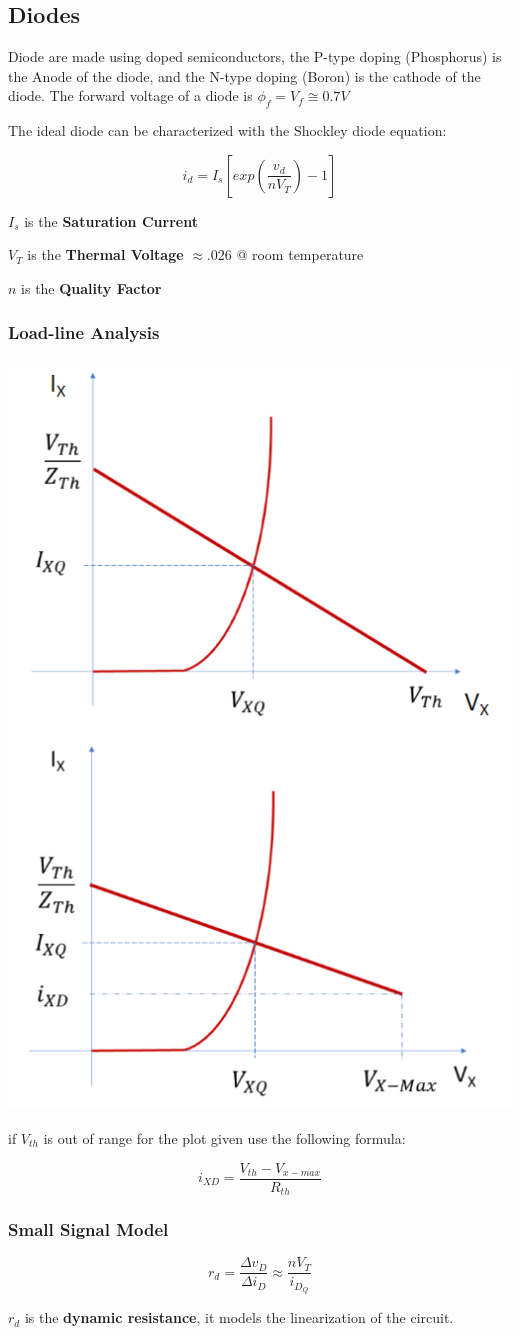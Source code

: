 \documentclass{article}
\begin{document}
\subsection*{Diodes}
\begin{center}
    Diode are made using doped semiconductors, the P-type doping (Phosphorus) is the Anode of the diode, and the N-type doping (Boron) is the cathode of the diode.
    \vspace{5mm}
    The forward voltage of a diode is $\phi_f = V_f \cong 0.7V$
    
    The ideal diode can be characterized with the Shockley diode equation:
\end{center}
\begin{equation}
    i_d = I_s [exp(\frac{v_d}{n V_T}) -1]
\end{equation}
\begin{center}
    $I_s$ is the \textbf{Saturation Current}
    
    $V_T$ is the \textbf{Thermal Voltage} $ \approx .026$ @ room temperature
    
    $n$ is the \textbf{Quality Factor}
\end{center}
\subsubsection*{Load-line Analysis}
\begin{center}
    \includegraphics[width = .3\textwidth]{loadline.png}
    
    if $V_{th}$ is out of range for the plot given use the following formula:
\end{center}
\begin{equation}
    i_{XD} = \frac{V_{th} - V_{x-max}}{R_{th}}
\end{equation}
\subsubsection*{Small Signal Model}
\begin{equation}
    r_d = \frac{\Delta v_D}{\Delta i_D} \approx \frac{n V_T}{i_{D_Q}}
\end{equation}
\begin{center}
    $r_d$ is the \textbf{dynamic resistance}, it models the linearization of the circuit.
\end{center}
\newpage
\end{document}
